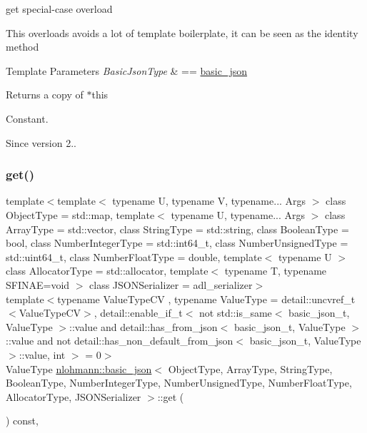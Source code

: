 get special-\/case overload 

This overloads avoids a lot of template boilerplate, it can be seen as the identity method


\begin{DoxyTemplParams}{Template Parameters}
{\em Basic\+Json\+Type} & == \mbox{\hyperlink{classnlohmann_1_1basic__json}{basic\+\_\+json}}\\
\hline
\end{DoxyTemplParams}
\begin{DoxyReturn}{Returns}
a copy of $\ast$this
\end{DoxyReturn}
Constant.

\begin{DoxySince}{Since}
version 2.. 
\end{DoxySince}
\mbox{\label{classnlohmann_1_1basic__json_a16f9445f7629f634221a42b967cdcd43}} 
\subsubsection{\texorpdfstring{get()}{get()}\hspace{0.1cm}{\footnotesize\ttfamily [2/5]}}
{\footnotesize\ttfamily template$<$template$<$ typename U, typename V, typename... Args $>$ class Object\+Type = std\+::map, template$<$ typename U, typename... Args $>$ class Array\+Type = std\+::vector, class String\+Type  = std\+::string, class Boolean\+Type  = bool, class Number\+Integer\+Type  = std\+::int64\+\_\+t, class Number\+Unsigned\+Type  = std\+::uint64\+\_\+t, class Number\+Float\+Type  = double, template$<$ typename U $>$ class Allocator\+Type = std\+::allocator, template$<$ typename T, typename S\+F\+I\+N\+A\+E=void $>$ class J\+S\+O\+N\+Serializer = adl\+\_\+serializer$>$ \\
template$<$typename Value\+Type\+CV , typename Value\+Type  = detail\+::uncvref\+\_\+t$<$\+Value\+Type\+C\+V$>$, detail\+::enable\+\_\+if\+\_\+t$<$ not std\+::is\+\_\+same$<$ basic\+\_\+json\+\_\+t, Value\+Type $>$\+::value and detail\+::has\+\_\+from\+\_\+json$<$ basic\+\_\+json\+\_\+t, Value\+Type $>$\+::value and not detail\+::has\+\_\+non\+\_\+default\+\_\+from\+\_\+json$<$ basic\+\_\+json\+\_\+t, Value\+Type $>$\+::value, int $>$  = 0$>$ \\
Value\+Type \mbox{\hyperlink{classnlohmann_1_1basic__json}{nlohmann\+::basic\+\_\+json}}$<$ Object\+Type, Array\+Type, String\+Type, Boolean\+Type, Number\+Integer\+Type, Number\+Unsigned\+Type, Number\+Float\+Type, Allocator\+Type, J\+S\+O\+N\+Serializer $>$\+::get (\begin{DoxyParamCaption}{ }\end{DoxyParamCaption}) const\hspace{0.3cm}{\ttfamily [inline]}, {\ttfamily [noexcept]}}



